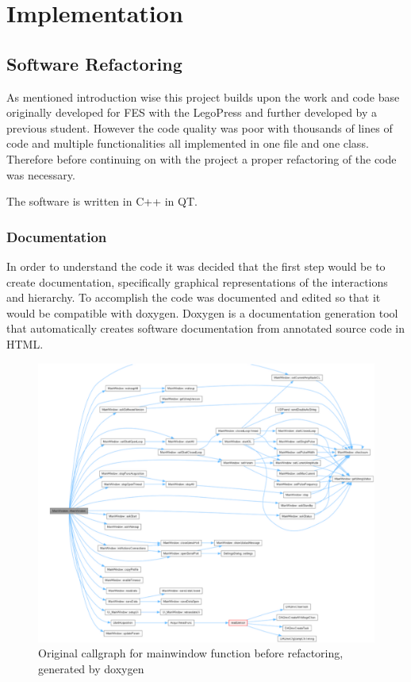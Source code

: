 
\section{Implementation}

\subsection{Software Refactoring}
As mentioned introduction wise this project builds upon the work and code base originally developed for FES with the LegoPress \cite{olivier_legopress_2014} and further developed by a previous student. However the code quality was poor with thousands of lines of code and multiple functionalities all implemented in one file and one class. Therefore before continuing on with the project a proper refactoring of the code was necessary.

The software is written in C++ in QT.

\subsubsection{Documentation}

In order to understand the code it was decided that the first step would be to create documentation, specifically graphical representations of the interactions and hierarchy. To accomplish the code was documented and edited so that it would be compatible with doxygen. Doxygen is a documentation generation tool that automatically creates software documentation from annotated source code in HTML.

\begin{figure} [H]
    \centering
    \includegraphics[width=0.9\linewidth]{images/oldDoxy.png}
    \caption{Original callgraph for mainwindow function before refactoring, generated by doxygen}
    \label{fig:oldDoxy}
\end{figure}

